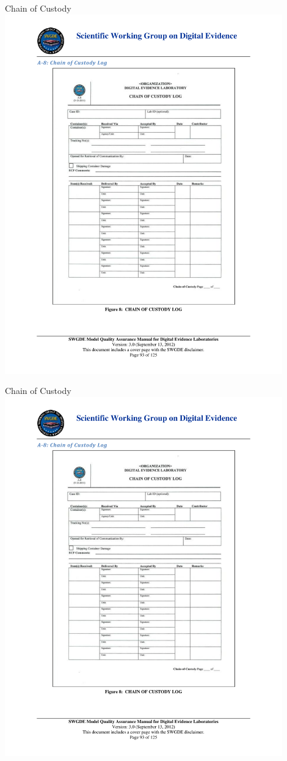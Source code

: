 \documentclass[pdf,table]{beamer}
\begin{document}
\begin{frame}{Chain of Custody \cite{SWDGE:v3} }
	\includegraphics[page=2,width=0.9\textwidth]{coc.pdf}
\end{frame}

\begin{frame}{Chain of Custody\cite{SWDGE:v3}}
	\includegraphics[page=3,width=0.9\textwidth]{coc.pdf}
\end{frame}
\end{document}
